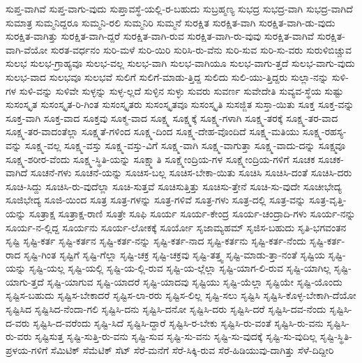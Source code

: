 {ಸುಪ್ತ-ವಾಗಿವೆ
ಸುಪ್ತ-ವಾಗು-ವುದು
ಸುಪ್ತಾವಸ್ಥೆ-ಯಲ್ಲಿ-ರ-ಬಹುದು
ಸುಬ್ರಹ್ಮಣ್ಯ
ಸುಭದ್ರ
ಸುಭದ್ರ-ವಾಗಿ
ಸುಭದ್ರ-ವಾಗಿದೆ
ಸುಮಾತ್ರ
ಸುಮ್ಮನಿದ್ದರೂ
ಸುಮ್ಮನಿ-ರಲಿ
ಸುಮ್ಮನಿರಿ
ಸುಮ್ಮನೆ
ಸುರಕ್ಷಿತ
ಸುರಕ್ಷಿತ-ವಾಗಿ
ಸುರಕ್ಷಿತ-ವಾಗಿ-ಡು-ವುದು
ಸುರಕ್ಷಿತ-ವಾಗಿತ್ತು
ಸುರಕ್ಷಿತ-ವಾಗಿ-ದ್ದರೆ
ಸುರಕ್ಷಿತ-ವಾಗಿ-ರುವ
ಸುರಕ್ಷಿತ-ವಾಗಿ-ರು-ವುವು
ಸುರಕ್ಷಿತ-ವಾಗಿವೆ
ಸುರಕ್ಷಿತ-ವಾಗಿ-ವೆಯೋ
ಸುರತ-ವರ್ಧನಂ
ಸುರಿ-ಮಳೆ
ಸುರಿ-ಯಿರಿ
ಸುರಿಸಿ-ರು-ವೆನು
ಸುರಿ-ಸುವ
ಸುರಿ-ಸು-ವರು
ಸುರುಳಿಬಿಚ್ಚುವ
ಸುಲಭ
ಸುಲಭ-ಗ್ರಾಹ್ಯವೂ
ಸುಲಭ-ವಲ್ಲ
ಸುಲಭ-ವಾಗಿ
ಸುಲಭ-ವಾಗಿಯೂ
ಸುಲಭ-ವಾಗು-ತ್ತದೆ
ಸುಲಭ-ವಾಗು-ವುದು
ಸುಲಭ-ವಾದ
ಸುಲಭವೂ
ಸುಲಭವೆ
ಸುಲಿಗೆ
ಸುಲಿಗೆ-ಮಾಡು-ತ್ತಿದ್ದ
ಸುಲಿದು
ಸುಲಿ-ಯು-ತ್ತಿದ್ದರು
ಸುಲ್ಲಾ-ನನ್ನು
ಸುಳಿ-ಗಳ
ಸುಳಿ-ವನ್ನು
ಸುಳಿವೇ
ಸುಳ್ಳನ್ನು
ಸುಳ್ಳ-ಲ್ಲದೆ
ಸುಳ್ಳಿನ
ಸುಳ್ಳು
ಸುವರು
ಸುವರ್ಣ
ಸುವೇದೇತಿ
ಸುವ್ಯವ-ಸ್ಥೆಯ
ಸುಷ್ಟು
ಸುಸಂಸ್ಕೃತ
ಸುಸಂಸ್ಕೃತ-ರಿ-ಗಿಂತ
ಸುಸಂಸ್ಕೃತರು
ಸುಸಂಸ್ಕೃತವೂ
ಸುಸಂಸ್ಕೃತಿ
ಸುಸಜ್ಜಿತ
ಸುಸ್ತಾ-ಯಿತು
ಸೂಕ್ತ
ಸೂಕ್ತ-ವನ್ನು
ಸೂಕ್ತ-ವಾಗಿ
ಸೂಕ್ತ-ವಾದ
ಸೂಕ್ತವು
ಸೂಕ್ಮ-ವಾದ
ಸೂಕ್ಷ್ಮ
ಸೂಕ್ಷ್ಮಕ್ಕೆ
ಸೂಕ್ಷ್ಮ-ಗಳಾಗಿ
ಸೂಕ್ಷ್ಮ-ತರಕ್ಕೆ
ಸೂಕ್ಷ್ಮ-ತರ-ವಾದ
ಸೂಕ್ಷ್ಮ-ತರ-ವಾದಂತೆಲ್ಲಾ
ಸೂಕ್ಷ್ಮತೆ-ಗಳಿಂದ
ಸೂಕ್ಷ್ಮ-ದಿಂದ
ಸೂಕ್ಷ್ಮ-ದೇಹ-ವೊಂದಿದೆ
ಸೂಕ್ಷ್ಮ-ಮತಿಯು
ಸೂಕ್ಷ್ಮ-ರಹಸ್ಯ-ವನ್ನು
ಸೂಕ್ಷ್ಮ-ವಲ್ಲ
ಸೂಕ್ಷ್ಮ-ವಸ್ತು
ಸೂಕ್ಷ್ಮ-ವಸ್ತು-ವಿಗೆ
ಸೂಕ್ಷ್ಮ-ವಾಗಿ
ಸೂಕ್ಷ್ಮ-ವಾಗುತ್ತಾ
ಸೂಕ್ಷ್ಮ-ವಾದು-ದನ್ನು
ಸೂಕ್ಷ್ಮವೂ
ಸೂಕ್ಷ್ಮ-ಶರೀರ-ವೆಂದು
ಸೂಕ್ಷ್ಮ-ಸ್ಥಿತಿ-ಯನ್ನು
ಸೂಕ್ಷ್ಮಾತಿ
ಸೂಕ್ಷ್ಮೇಂದ್ರಿಯ-ಗಳ
ಸೂಕ್ಷ್ಮೇಂದ್ರಿಯ-ಗಳಿಗೆ
ಸೂಚಕ
ಸೂಚಕ-ವಾಗಿದೆ
ಸೂಚನೆ-ಗಳು
ಸೂಚನೆ-ಯನ್ನು
ಸೂಚಿಸ-ಬಲ್ಲ
ಸೂಚಿಸ-ಬೇಕಾ-ಯಿತು
ಸೂಚಿಸಿ
ಸೂಚಿಸಿ-ದಂತೆ
ಸೂಚಿಸಿ-ದರು
ಸೂಚಿ-ಸಿದ್ದು
ಸೂಚಿಸಿ-ರು-ವುದೆಲ್ಲಾ
ಸೂಚಿ-ಸುತ್ತವೆ
ಸೂಚಿಸುತ್ತಿತ್ತು
ಸೂಚಿಸು-ತ್ತೇನೆ
ಸೂಚಿ-ಸು-ವುದೇ
ಸೂಚೀಭೇದ್ಯ
ಸೂಜಿಭೇದ್ಯ
ಸೂಜಿ-ಯಿಂದ
ಸೂತ್ರ
ಸೂತ್ರ-ಗಳನ್ನು
ಸೂತ್ರ-ಗಳಿವೆ
ಸೂತ್ರ-ಗಳು
ಸೂತ್ರ-ದಲ್ಲಿ
ಸೂತ್ರ-ವನ್ನು
ಸೂತ್ರ-ವೃತ್ತಿ-ಯನ್ನು
ಸೂತ್ರಾಕ್ಷ
ಸೂತ್ರಾಕ್ಷ-ರಾಣಿ
ಸೂತ್ರೇ
ಸೂಫಿ
ಸೂರ್ಯ
ಸೂರ್ಯ-ಕೇಂದ್ರ
ಸೂರ್ಯ-ಚಂದ್ರಾದಿ-ಗಳು
ಸೂರ್ಯ-ನನ್ನು
ಸೂರ್ಯ-ನ-ಲ್ಲಿದ್ದ
ಸೂರ್ಯನು
ಸೂರ್ಯ-ಲೋಕಕ್ಕೆ
ಸೂರ್ಯೋ
ಸೃಜಾಮ್ಯಹಮ್
ಸೃಜಿಸ-ಬಹುದು
ಸೃತಿ-ಭಗವಂತನ
ಸೃಷ್ಟಿ
ಸೃಷ್ಟಿ-ಕರ್ತ
ಸೃಷ್ಟಿ-ಕರ್ತನ
ಸೃಷ್ಟಿ-ಕರ್ತ-ನನ್ನು
ಸೃಷ್ಟಿ-ಕರ್ತ-ನಾದ
ಸೃಷ್ಟಿ-ಕರ್ತನು
ಸೃಷ್ಟಿ-ಕರ್ತ-ನೆಂದು
ಸೃಷ್ಟಿ-ಕರ್ತ-ರಾದ
ಸೃಷ್ಟಿ-ಗಿಂತ
ಸೃಷ್ಟಿಗೆ
ಸೃಷ್ಟಿ-ಗೆಲ್ಲಾ
ಸೃಷ್ಟಿ-ಚಕ್ರ
ಸೃಷ್ಟಿ-ಚಕ್ರವು
ಸೃಷ್ಟಿ-ತತ್ತ್ವ
ಸೃಷ್ಟಿ-ಮಾಡು-ತ್ತಾ-ನಂತೆ
ಸೃಷ್ಟಿಯ
ಸೃಷ್ಟಿ-ಯನ್ನು
ಸೃಷ್ಟಿ-ಯಲ್ಲ
ಸೃಷ್ಟಿ-ಯಲ್ಲಿ
ಸೃಷ್ಟಿ-ಯ-ಲ್ಲಿ-ರುವ
ಸೃಷ್ಟಿ-ಯ-ಲ್ಲೆಲ್ಲಾ
ಸೃಷ್ಟಿ-ಯಾಗ-ಲಿ-ರುವ
ಸೃಷ್ಟಿ-ಯಾಗಿಲ್ಲ
ಸೃಷ್ಟಿ-ಯಾಗು-ತ್ತದೆ
ಸೃಷ್ಟಿ-ಯಾಗುವ
ಸೃಷ್ಟಿ-ಯಾದರೆ
ಸೃಷ್ಟಿ-ಯಾದವು
ಸೃಷ್ಟಿಯು
ಸೃಷ್ಟಿ-ಯೆಲ್ಲಾ
ಸೃಷ್ಟಿಯೇ
ಸೃಷ್ಟಿ-ಯೊಂದು
ಸೃಷ್ಟಿಸ-ಬಹುದು
ಸೃಷ್ಟಿಸ-ಬೇಕಾದರೆ
ಸೃಷ್ಟಿಸ-ಲಾ-ರರು
ಸೃಷ್ಟಿಸ-ಲಿಲ್ಲ
ಸೃಷ್ಟಿ-ಸಲು
ಸೃಷ್ಟಿಸಿ
ಸೃಷ್ಟಿಸಿ-ಕೊಳ್ಳ-ಬೇಕಾಗಿ-ದೆಯೋ
ಸೃಷ್ಟಿಸಿದ
ಸೃಷ್ಟಿಸಿದ-ನೆಂದಾ-ಗಲಿ
ಸೃಷ್ಟಿಸಿ-ದನು
ಸೃಷ್ಟಿಸಿ-ದನೋ
ಸೃಷ್ಟಿಸಿ-ದರು
ಸೃಷ್ಟಿಸಿ-ದರೆ
ಸೃಷ್ಟಿಸಿ-ದವ-ನೆಂದು
ಸೃಷ್ಟಿಸಿ-ದ-ವರು
ಸೃಷ್ಟಿಸಿ-ದ-ವರೆಂದು
ಸೃಷ್ಟಿ-ಸಿದೆ
ಸೃಷ್ಟಿಸಿ-ದ್ದಾರೆ
ಸೃಷ್ಟಿಸಿ-ರ-ಬೇಕು
ಸೃಷ್ಟಿಸಿ-ರು-ವಂತೆ
ಸೃಷ್ಟಿಸಿ-ರು-ವನು
ಸೃಷ್ಟಿಸಿ-ರು-ವರು
ಸೃಷ್ಟಿಸುತ್ತ
ಸೃಷ್ಟಿ-ಸುತ್ತಿ-ರು-ವನು
ಸೃಷ್ಟಿ-ಸುವ
ಸೃಷ್ಟಿ-ಸು-ವನು
ಸೃಷ್ಟಿ-ಸು-ವುದಕ್ಕೆ
ಸೃಷ್ಟಿ-ಸು-ವುದಿಲ್ಲ
ಸೃಷ್ಟಿ-ಸ್ಥಿತಿ-ಪ್ರಳಯ-ಗಳಿಗೆ
ಸೆಮಿಟಿಕ್
ಸೆಮೆಟಿಕ್
ಸೆಟ್
ಸೆರೆ-ಮನೆಗೆ
ಸೆರೆ-ಸಿಕ್ಕಿ-ರುವ
ಸೆರೆ-ಹಿಡಿಯುವು-ದಾಗಿತ್ತು
ಸೆಳೆ-ದಿದ್ದೀರಿ
}
